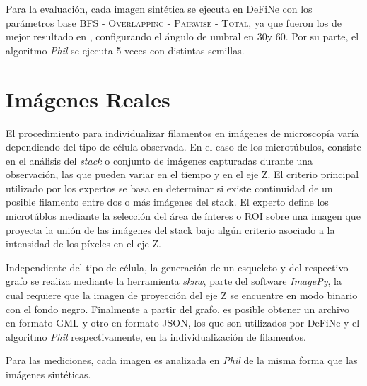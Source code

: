 Para la evaluaci\'on, cada imagen sint\'etica se ejecuta en DeFiNe con los par\'ametros base \textsc{BFS - Overlapping - Pairwise - Total}, ya que fueron los de mejor resultado en \cite{breuer2015define}, configurando el \'angulo de umbral en 30\textdegree y 60\textdegree. Por su parte, el algoritmo {\it Phil} se ejecuta 5 veces con distintas semillas.

\section{Im\'agenes Reales}
El procedimiento para individualizar filamentos en im\'agenes de microscop\'ia var\'ia dependiendo del tipo de c\'elula observada. En el caso de los microt\'ubulos, consiste en el an\'alisis del {\it stack} o conjunto de im\'agenes capturadas durante una observaci\'on, las que pueden variar en el tiempo y en el eje Z. El criterio principal utilizado por los expertos se basa en determinar si existe continuidad de un posible filamento entre dos o m\'as im\'agenes del stack. %
El experto define los microt\'ublos mediante la selecci\'on del \'area de \'interes o ROI sobre una imagen que proyecta la uni\'on de las im\'agenes del stack bajo alg\'un criterio asociado a la intensidad de los p\'ixeles en el eje Z. 


Independiente del tipo de c\'elula, la generaci\'on de un esqueleto y del respectivo grafo se realiza mediante la herramienta {\it sknw}, parte del software {\it ImagePy}\cite{wang2018imagepy}, la cual requiere que la imagen de proyecci\'on del eje Z se encuentre en modo binario con el fondo negro. Finalmente a partir del grafo, es posible obtener un archivo en formato GML y otro en formato JSON, los que son utilizados por DeFiNe y el algoritmo {\it Phil} respectivamente, en la individualizaci\'on de filamentos.


Para las mediciones, cada imagen es analizada en {\it Phil} de la misma forma que las im\'agenes sint\'eticas.

